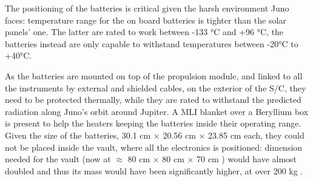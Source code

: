 The positioning of the batteries is critical given the harsh environment Juno faces: temperature range for the on board batteries is tighter than the solar panels' one. The latter are rated to work between -133 °C and +96 °C, the batteries instead are only capable to withstand temperatures between -20°C to +40°C. 

As the batteries are mounted on top of the propulsion module, and linked to all the instruments by external and shielded cables, on the exterior of the S/C, they need to be protected thermally, while they are rated to withstand the predicted radiation along Juno's orbit around Jupiter\cite{batteries_position}. A MLI blanket over a Beryllium box is present to help the heaters keeping the batteries inside their operating range. Given the size of the batteries, 30.1 cm $\times$ 20.56 cm $\times$ 23.85 cm each, they could not be placed inside the vault, where all the electronics is positioned: dimension needed for the vault (now at  $\approx$ 80 cm $\times$ 80 cm $\times$ 70 cm ) would have almost doubled and thus its mass would have been significantly higher, at over 200 kg \cite{batteries_position}. 